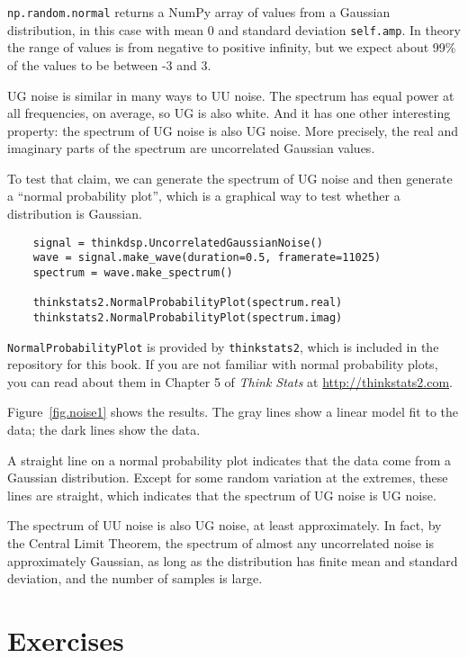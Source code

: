 {\tt np.random.normal} returns a NumPy array of values from a
Gaussian distribution, in this case with mean 0 and standard deviation
{\tt self.amp}.  In theory the range of values is from negative to
positive infinity, but we expect about 99\% of the values to be
between -3 and 3.

UG noise is similar in many ways to UU noise.  The spectrum has
equal power at all frequencies, on average, so UG is also white.
And it has one other interesting property: the spectrum of UG
noise is also UG noise.  More precisely, the real and imaginary
parts of the spectrum are uncorrelated Gaussian values.

To test that claim, we can generate the spectrum of UG noise and
then generate a ``normal probability plot'', which is a graphical
way to test whether a distribution is Gaussian.

\begin{verbatim}
	signal = thinkdsp.UncorrelatedGaussianNoise()
	wave = signal.make_wave(duration=0.5, framerate=11025)
	spectrum = wave.make_spectrum()
	
	thinkstats2.NormalProbabilityPlot(spectrum.real)
	thinkstats2.NormalProbabilityPlot(spectrum.imag)
\end{verbatim}

{\tt NormalProbabilityPlot} is provided by {\tt thinkstats2}, which is
included in the repository for this book.  If you are not familiar
with normal probability plots, you can read about them in Chapter 5
of {\it Think Stats} at \url{http://thinkstats2.com}.

Figure~\ref{fig.noise1} shows the results.  The gray lines
show a linear model fit to the data; the dark lines show the
data.

A straight line on a normal probability plot indicates
that the data come from a Gaussian distribution.  Except for
some random variation at the extremes, these lines are straight,
which indicates that the spectrum of UG noise is UG noise.

The spectrum of UU noise is also UG noise, at least approximately.  In
fact, by the Central Limit Theorem, the spectrum of almost any
uncorrelated noise is approximately Gaussian, as long as the
distribution has finite mean and standard deviation, and the number of
samples is large.


\section{Exercises}

